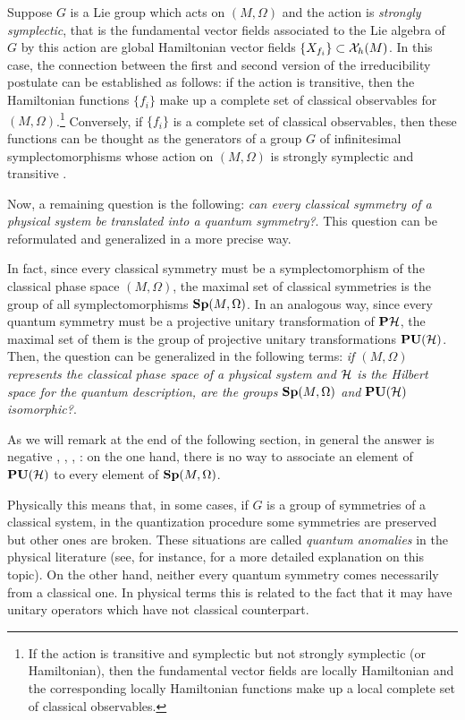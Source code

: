 \documentclass[12pt]{article}
\theoremstyle{plain}
\def\H{{\cal H}}
\begin{document}
Suppose $G$ is a Lie group which acts on $(M,\Omega )$
and the action is {\it strongly symplectic},
that is the fundamental vector fields associated
to the Lie algebra of $G$ by this action are
global Hamiltonian vector fields $\{ X_{f_i} \} \subset {\cal X}_h(M)$.
In this case, the connection between the first and second version
of the irreducibility postulate can be established as follows:
if the action is transitive, then the Hamiltonian functions $\{ f_i \}$
make up a
complete set of classical observables for $(M,\Omega )$.\footnote{
If the action is transitive and symplectic but not strongly symplectic
(or Hamiltonian),
then the fundamental vector fields are locally Hamiltonian
and the corresponding locally Hamiltonian functions
make up a local complete set of classical observables.
}
Conversely, if $\{ f_i \}$ is a complete set of classical observables,
then these functions can be thought as the generators of a
group $G$ of infinitesimal symplectomorphisms
whose action on $(M,\Omega )$ is strongly symplectic and
transitive \cite{Ki-gq}.

Now, a remaining question is the following:
{\it can every classical symmetry of a physical system
be translated into a quantum symmetry?}.
This question can be reformulated and generalized in a more precise way.

In fact, since every classical symmetry must be
a symplectomorphism of the classical phase space $(M,\Omega )$,
the maximal set of classical symmetries is
the group of all symplectomorphisms ${\bf Sp}(M,\Omega )$.
In an analogous way, since every quantum symmetry must be
a projective unitary transformation of ${\bf P}\H$,
the maximal set of them is the group of projective unitary
transformations ${\bf PU}(\H )$.
Then, the question can be generalized in the following terms:
{\it if $(M,\Omega )$ represents the classical phase space of a physical
system
and $\H$ is the Hilbert space for the quantum description,
are the groups ${\bf Sp}(M,\Omega )$ and ${\bf PU}(\H )$ isomorphic?}.

As we will remark at the end of the following section, in general the
answer is negative
\cite{AM-78}, \cite{Go-80}, \cite{Gr-46}, \cite{Vh-51}:
on the one hand, there is no way to associate
an element of ${\bf PU}(\H )$ to every element of ${\bf Sp}(M,\Omega )$.

Physically this means that, in some cases,
if $G$ is a group of symmetries of a classical system,
in the quantization procedure some symmetries are preserved
but other ones are broken. These situations are called
{\it quantum anomalies} in the physical literature
(see, for instance, \cite{GS-dggt} for a more detailed explanation on
this topic).
On the other hand, neither every quantum symmetry
comes necessarily from a classical one.
In physical terms this is related to the fact that it may have
unitary operators which have not classical counterpart.
\end{document}
